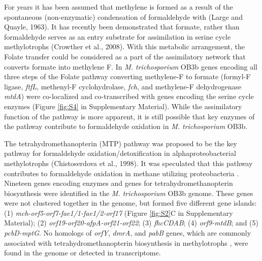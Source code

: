 For years it has been assumed that methylene  is formed as a result of the spontaneous (non-enzymatic) condensation of formaldehyde with  (Large and Quayle, 1963).
It has recently been demonstrated that formate, rather than formaldehyde serves as an entry substrate for assimilation in serine cycle methylotrophs (Crowther et al., 2008).
With this metabolic arrangement, the Folate  transfer could be considered as a part of the assimilatory network that converts formate into methylene F.
In \textit{M. trichosporium} OB3b genes encoding all three steps of the Folate pathway converting methylene-F to formate (formyl-F ligase, \textit{ftfL}, methenyl-F cyclohydrolase, \textit{fch}, and methylene-F dehydrogenase \textit{mtdA}) were co-localized and co-transcribed with genes encoding the serine cycle enzymes (Figure \ref{fig:S4} in Supplementary Material).
While the assimilatory function of the pathway is more apparent, it is still possible that key enzymes of the pathway contribute to formaldehyde oxidation in \textit{M. trichosporium} OB3b.

The tetrahydromethanopterin (MTP) pathway was proposed to be the key pathway for formaldehyde oxidation/detoxification in alphaproteobacterial methylotrophs (Chistoserdova et al., 1998).
It was speculated that this pathway contributes to formaldehyde oxidation in methane utilizing proteobacteria \cite{vorholt1999}.
Nineteen genes encoding enzymes and genes for tetrahydromethanopterin biosynthesis were identified in the \textit{M. trichosporium} OB3b genome.
These genes were not clustered together in the genome, but formed five different gene islands: (1) \textit{mch-orf5-orf7-fae1/1-fae1/2-orf17} (Figure \ref{fig:S2}C in Supplementary Material); (2) \textit{orf19-orf20-afpA-orf21-orf22}; (3) \textit{fhcCDAB}; (4) \textit{orf9-mtdB}; and (5) \textit{pcbD-mptG}.
No homologs of \textit{orfY}, \textit{dmrA}, and \textit{pabB} genes, which are commonly associated with tetrahydromethanopterin biosynthesis in methylotrophs \cite{caccamo2004, rasche2004, chistoserdova2005, kalyuzhnaya2005}, were found in the genome or detected in transcriptome.

